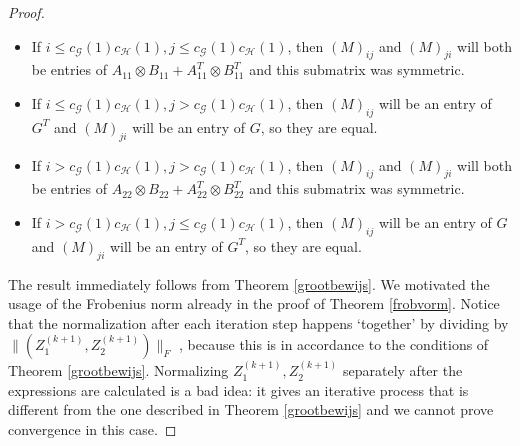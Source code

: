 \documentclass[a4paper,11pt]{report}
\newcommand{\graf}{\mathscr{G}}
\newcommand{\grafeen}{\mathscr{H}}
\begin{document}
\begin{proof}
\begin{itemize}
  \item If $i \leq c_\graf(1)c_\grafeen(1), j \leq c_\graf(1)c_\grafeen(1)$, 
  then $(M)_{ij}$ and $(M)_{ji}$ will both be entries of $A_{11}\otimes B_{11} + A^T_{11}\otimes B^T_{11}$ and this submatrix was symmetric.
  \item If $i \leq c_\graf(1)c_\grafeen(1), j > c_\graf(1)c_\grafeen(1)$, then $(M)_{ij}$ 
  will be an entry of $G^T$ and $(M)_{ji}$ will be an entry of $G$, so they are 
  equal.
  \item If $i > c_\graf(1)c_\grafeen(1), j > c_\graf(1)c_\grafeen(1)$, then $(M)_{ij}$ and $(M)_{ji}$ will both be entries of $A_{22}\otimes B_{22} + A^T_{22}\otimes B^T_{22}$ and this submatrix was symmetric.
   \item If $i > c_\graf(1)c_\grafeen(1), j \leq c_\graf(1)c_\grafeen(1)$, then $(M)_{ij}$ 
  will be an entry of $G$ and $(M)_{ji}$ will be an entry of $G^T$, so they are 
  equal.
  \end{itemize}

The result immediately follows from Theorem \ref{grootbewijs}. We motivated the usage of the Frobenius norm
already in the proof of  Theorem \ref{frobvorm}. Notice that the normalization after each iteration step happens 
`together' by dividing by $\|(Z^{(k+1)}_1, Z^{(k+1)}_2)\|_F$ , because this is in accordance to the conditions of Theorem \ref{grootbewijs}.
Normalizing $Z^{(k+1)}_1, Z^{(k+1)}_2$ separately after the expressions are 
calculated is a bad idea: it gives an iterative process that is different from the one described 
in Theorem \ref{grootbewijs} and we cannot prove convergence in this case.


\end{proof}
\end{document}
